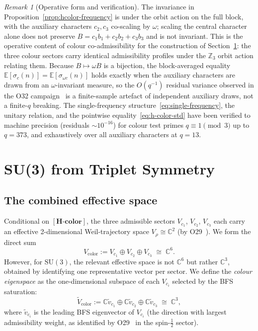\documentclass[11pt,a4paper]{article}
\theoremstyle{definition}
\theoremstyle{remark}
\newtheorem{remark}[theorem]{Remark}
\newcommand{\SU}{\mathrm{SU}}
\newcommand{\Hcolor}{\mathbf{[H\text{-}color]}}
\newcommand{\Z}{\mathbb{Z}}
\newcommand{\C}{\mathbb{C}}
\begin{document}
      \begin{remark}[Operative form and verification]
        \label{rmk:hcolor-precision}
        The invariance in Proposition~\ref{prop:hcolor-frequency} is under the orbit action on the
        full block, with the auxiliary characters $c_2, c_3$ co-scaling by $\omega$; scaling the
        central character alone does not preserve $B = c_1 b_1 + c_2 b_2 + c_3 b_3$ and is not
        invariant.
        This is the operative content of colour co-admissibility for the construction of
        Section~\ref{sec:su3-from-triplet}: the three colour sectors carry identical admissibility
        profiles under the $\Z_3$ orbit action relating them.
        Because $B \mapsto \omega B$ is a bijection, the block-averaged equality
        $\mathbb{E}[\sigma_c(n)] = \mathbb{E}[\sigma_{\omega c}(n)]$ holds exactly when the auxiliary
        characters are drawn from an $\omega$-invariant measure, so the $O(q^{-1})$ residual
        variance observed in the O32 campaign~\cite{Beau2026a36} is a finite-sample artefact of
        independent auxiliary draws, not a finite-$q$ breaking.
        The single-frequency structure~\eqref{eq:single-frequency}, the unitary relation, and the
        pointwise equality~\eqref{eq:h-color-std} have been verified to machine precision
        (residuals $\sim 10^{-16}$) for colour test primes $q \equiv 1 \pmod{3}$ up to $q = 373$,
        and exhaustively over all auxiliary characters at $q = 13$.
      \end{remark}

  \section{SU(3) from Triplet Symmetry}
    \label{sec:su3-from-triplet}

    \subsection{The combined effective space}
      \label{ssec:combined-space}

      Conditional on $\Hcolor$, the three admissible sectors $V_{c_1}$, $V_{c_2}$, $V_{c_3}$ each
      carry an effective 2-dimensional Weil-trajectory space $V_\rho \cong \C^2$ (by O29~\cite{Beau2026a33}).
      We form the direct sum
      \begin{equation}
        V_{\mathrm{color}} := V_{c_1} \oplus V_{c_2} \oplus V_{c_3} \;\cong\; \C^6.
      \end{equation}
      However, for $\SU(3)$, the relevant effective space is not $\C^6$ but rather $\C^3$, obtained
      by identifying one representative vector per sector.
      We define the \emph{colour eigenspace} as the one-dimensional subspace of each $V_{c_i}$
      selected by the BFS saturation:
      \begin{equation}
        \tilde{V}_{\mathrm{color}} := \C \tilde{v}_{c_1} \oplus \C \tilde{v}_{c_2} \oplus \C \tilde{v}_{c_3}
        \;\cong\; \C^3,
      \end{equation}
      where $\tilde{v}_{c_i}$ is the leading BFS eigenvector of $V_{c_i}$ (the direction with largest
      admissibility weight, as identified by O29~\cite{Beau2026a33} in the spin-$\tfrac{1}{2}$ sector).
\end{document}
